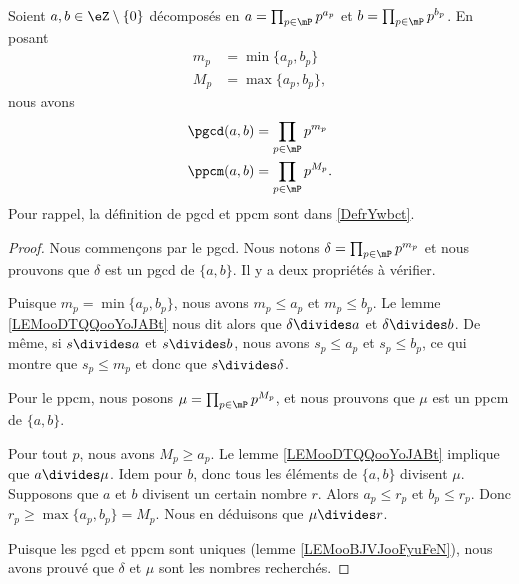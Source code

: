 \begin{proposition}     \label{PROPooNQBOooHWqTvs}
	Soient \( a,b\in \eZ\setminus\{ 0 \}\) décomposés en \( a=\prod_{p\in\mP}p^{a_p}\) et \( b=\prod_{p\in\mP}p^{b_p}\). En posant
	\begin{subequations}
		\begin{align}
			m_p & = \min\{ a_p,b_p \}  \\
			M_p & = \max\{ a_p,b_p \},
		\end{align}
	\end{subequations}
	nous avons
	\begin{subequations}
		\begin{align}
			\pgcd(a,b) & = \prod_{p\in\mP}p^{m_p}  \\
			\ppcm(a,b) & = \prod_{p\in\mP}p^{M_p}.
		\end{align}
	\end{subequations}
	Pour rappel, la définition de pgcd et ppcm sont dans \ref{DefrYwbct}.
\end{proposition}

\begin{proof}
	Nous commençons par le pgcd. Nous notons \( \delta=\prod_{p\in\mP}p^{m_p}\) et nous prouvons que \( \delta\) est un pgcd de \( \{ a,b \}\). Il y a deux propriétés à vérifier.

	\begin{subproof}
		Puisque \( m_p=\min\{ a_p,b_p \}\), nous avons \( m_p\leq a_p\) et \( m_p\leq b_p\). Le lemme \ref{LEMooDTQQooYoJABt} nous dit alors que \( \delta\divides a\) et \( \delta\divides b\).
		\spitem[Si \( s\) divise \( a\) et \( b\)]
		De même, si \(s\divides a\) et \( s\divides b\), nous avons \( s_p\leq a_p\) et \( s_p\leq b_p\), ce qui montre que \( s_p\leq m_p\) et donc que \( s\divides \delta\).
	\end{subproof}

	Pour le ppcm, nous posons \( \mu=\prod_{p\in\mP}p^{M_p}\), et nous prouvons que \( \mu\) est un ppcm de \( \{ a,b \}\).
	\begin{subproof}
		\spitem[\( a\) et \( b\) divisent \( \mu\)]
		Pour tout \( p\), nous avons \( M_p\geq a_p\). Le lemme \ref{LEMooDTQQooYoJABt} implique que \( a\divides \mu\). Idem pour \( b\), donc tous les éléments de \( \{ a,b \}\) divisent \( \mu\).
		\spitem[Si \( a\) et \( b\) divisent \( r\)]
		Supposons que \( a\) et \( b\) divisent un certain nombre \( r\). Alors \( a_p\leq r_p\) et \( b_p\leq r_p\). Donc \( r_p\geq\max\{ a_p,b_p \}=M_p\). Nous en déduisons que \( \mu\divides r\).
	\end{subproof}

	Puisque les pgcd et ppcm sont uniques (lemme \ref{LEMooBJVJooFyuFeN}), nous avons prouvé que \( \delta\) et \( \mu\) sont les nombres recherchés.
\end{proof}

